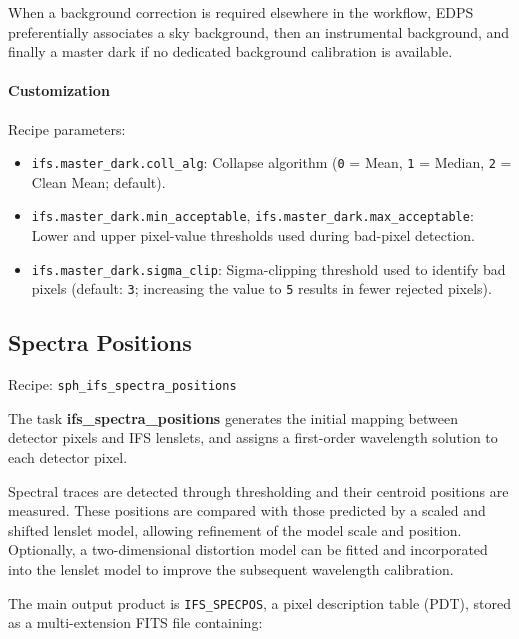 When a background correction is required elsewhere in the workflow, EDPS preferentially associates a sky background, then an instrumental background, and finally a master dark if no dedicated background calibration is available.

\paragraph{Customization}

Recipe parameters:

\begin{itemize}
\item \texttt{ifs.master\_dark.coll\_alg}: Collapse algorithm
(\texttt{0} = Mean,
 \texttt{1} = Median,
 \texttt{2} = Clean Mean; default).

\item \texttt{ifs.master\_dark.min\_acceptable},
\texttt{ifs.master\_dark.max\_acceptable}:
Lower and upper pixel-value thresholds used during bad-pixel detection.

\item \texttt{ifs.master\_dark.sigma\_clip}:
Sigma-clipping threshold used to identify bad pixels
(default: \texttt{3}; increasing the value to
\texttt{5} results in fewer rejected pixels).
\end{itemize}


\subsection{Spectra Positions}

Recipe:
\texttt{sph\_ifs\_spectra\_positions}

The task \textbf{ifs\_spectra\_positions} generates the initial mapping
between detector pixels and IFS lenslets, and assigns a first-order
wavelength solution to each detector pixel.

Spectral traces are detected through thresholding and their centroid
positions are measured. These positions are compared with those predicted
by a scaled and shifted lenslet model, allowing refinement of the model
scale and position. Optionally, a two-dimensional distortion model can be
fitted and incorporated into the lenslet model to improve the subsequent
wavelength calibration.

The main output product is \texttt{IFS\_SPECPOS}, a pixel description table (PDT), stored as a multi-extension FITS file containing:

